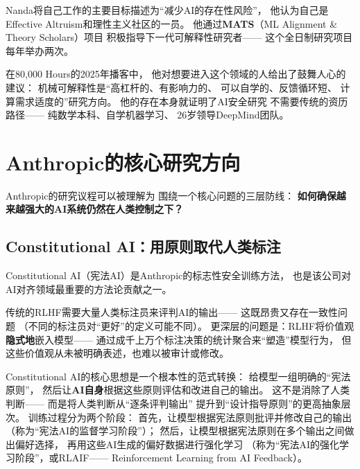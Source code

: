 Nanda将自己工作的主要目标描述为``减少AI的存在性风险''，
他认为自己是Effective Altruism和理性主义社区的一员。
他通过\textbf{MATS}（ML Alignment \& Theory Scholars）项目
积极指导下一代可解释性研究者——
这个全日制研究项目每年举办两次。

在80,000 Hours的2025年播客中，
他对想要进入这个领域的人给出了鼓舞人心的建议：
机械可解释性是``高杠杆的、有影响力的、
可以自学的、反馈循环短、
计算需求适度的''研究方向。
他的存在本身就证明了AI安全研究
不需要传统的资历路径——
纯数学本科、自学机器学习、
26岁领导DeepMind团队。


\section{Anthropic的核心研究方向}
\label{sec:anthropic-research-directions}

Anthropic的研究议程可以被理解为
围绕一个核心问题的三层防线：
\textbf{如何确保越来越强大的AI系统仍然在人类控制之下？}

\subsection{Constitutional AI：用原则取代人类标注}
\label{subsec:constitutional-ai}

Constitutional AI（宪法AI）是Anthropic的标志性安全训练方法，
也是该公司对AI对齐领域最重要的方法论贡献之一。

传统的RLHF需要大量人类标注员来评判AI的输出——
这既昂贵又存在一致性问题
（不同的标注员对``更好''的定义可能不同）。
更深层的问题是：RLHF将价值观\textbf{隐式地}嵌入模型——
通过成千上万个标注决策的统计聚合来``塑造''模型行为，
但这些价值观从未被明确表述，也难以被审计或修改。

Constitutional AI的核心思想是一个根本性的范式转换：
给模型一组明确的``宪法原则''，
然后让\textbf{AI自身}根据这些原则评估和改进自己的输出。
这不是消除了人类判断——
而是将人类判断从``逐条评判输出''
提升到``设计指导原则''的更高抽象层次。
训练过程分为两个阶段：
首先，让模型根据宪法原则批评并修改自己的输出
（称为``宪法AI的监督学习阶段''）；
然后，让模型根据宪法原则在多个输出之间做出偏好选择，
再用这些AI生成的偏好数据进行强化学习
（称为``宪法AI的强化学习阶段''，或RLAIF——
Reinforcement Learning from AI Feedback）。

